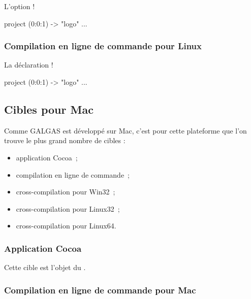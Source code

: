 L'option \ggs!%
\begin{galgas}
project (0:0:1) -> "logo" {
  ...
}
\end{galgas}

\subsubsection{Compilation en ligne de commande pour Linux}

La déclaration \ggs!%
\begin{galgas}
project (0:0:1) -> "logo" {
  ...
}
\end{galgas}



\subsection{Cibles pour Mac}

Comme GALGAS est développé sur Mac, c'est pour cette plateforme que l'on trouve le plus grand nombre de cibles :
\begin{itemize}
  \item application Cocoa~;
  \item compilation en ligne de commande~;
  \item cross-compilation pour Win32~;
  \item cross-compilation pour Linux32~;
  \item cross-compilation pour Linux64.
\end{itemize}

\subsubsection{Application Cocoa}

Cette cible est l'objet du .

\subsubsection{Compilation en ligne de commande pour Mac}

